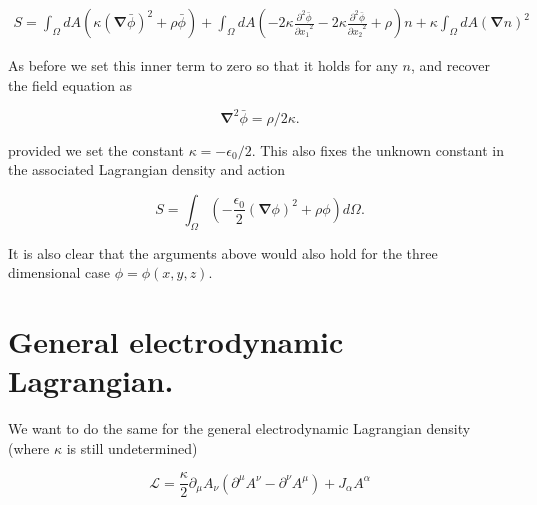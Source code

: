 \documentclass{article}
\newcommand{\LL}[0]{\mathcal{L}}
\newcommand{\spacegrad}[0]{\boldsymbol{\nabla}}
\newcommand{\PDd}[2]{\frac{\partial^2 {#2}}{{\partial{#1}}^2}}
\begin{document}
\begin{align*}
S = \int_{\Omega} dA \left( \kappa {(\spacegrad \bar{\phi})}^2 + \rho \bar{\phi} \right)
  + \int_{\Omega} dA \left( -2 \kappa \PDd{x_1}{\bar{\phi}} -2 \kappa \PDd{x_2}{\bar{\phi}} + \rho \right) n
  + \kappa \int_{\Omega} dA {(\spacegrad n)}^2
\end{align*}

As before we set this inner term to zero so that it holds for any $n$, and recover the field equation as

\begin{equation*}
\spacegrad^2 \bar{\phi} = \rho/2 \kappa.
\end{equation*}

provided we set the constant $\kappa = -\epsilon_0/2$.  This also fixes the unknown constant in the associated Lagrangian density and action

\begin{equation}
S = \int_{\Omega} \left(- \frac{\epsilon_0}{2} (\spacegrad \phi)^2 + \rho \phi \right) d\Omega.
\end{equation}

It is also clear that the arguments above would also hold for the three dimensional case $\phi = \phi(x, y, z)$.

\section{ General electrodynamic Lagrangian. }

We want to do the same for the general electrodynamic Lagrangian density (where $\kappa$ is still undetermined)

\begin{equation}
\LL = \frac{\kappa}{2} \partial_{\mu} A_{\nu} ( \partial^{\mu} A^{\nu} - \partial^{\nu} A^{\mu} ) + J_{\alpha} A^{\alpha}
\end{equation}
\end{document}
